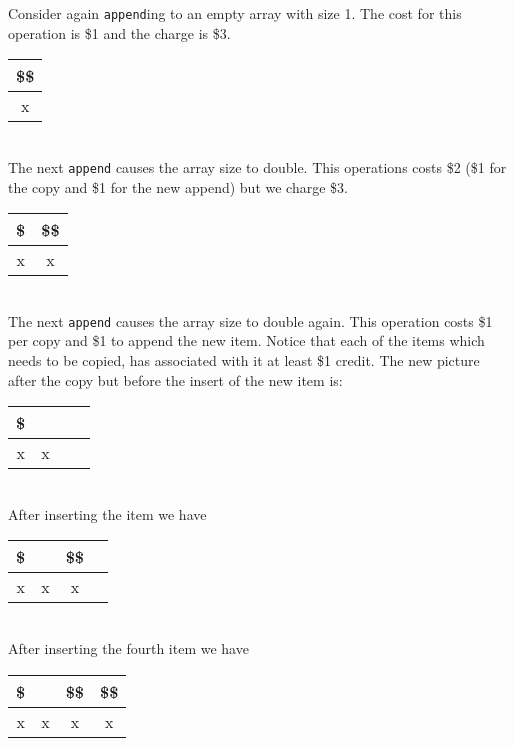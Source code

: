 \noindent Consider again \texttt{append}ing to an empty array with size 1. The cost for this operation is \$1 and the charge is \$3. \\

\begin{tabular}{| c |}
  \$\$ \\
  \hline x \\ \hline
\end{tabular} \\

\noindent The next \texttt{append} causes the array size to double. This operations costs \$2 (\$1 for the copy and \$1 for the new append) but we charge \$3. \\

\begin{tabular}{| c | c |}
  \$ & \$\$ \\
  \hline x & x \\ \hline
\end{tabular} \\

\noindent The next \texttt{append} causes the array size to double again. This operation costs \$1 per copy and \$1 to append the new item. Notice that each of the items which needs to be copied, has associated with it at least \$1 credit. The new picture after the copy but before the insert of the new item is: \\

\begin{tabular}{| c | c | c | c |}
  \$ & & & \\
  \hline x & x & & \\ \hline
\end{tabular} \\

\noindent After inserting the item we have \\

\begin{tabular}{| c | c | c | c |}
  \$ & & \$\$ & \\
  \hline x & x & x & \\ \hline
\end{tabular} \\

\noindent After inserting the fourth item we have \\

\begin{tabular}{| c | c | c | c |}
  \$ & & \$\$ & \$\$\\
  \hline x & x & x & x \\ \hline
\end{tabular} \\

